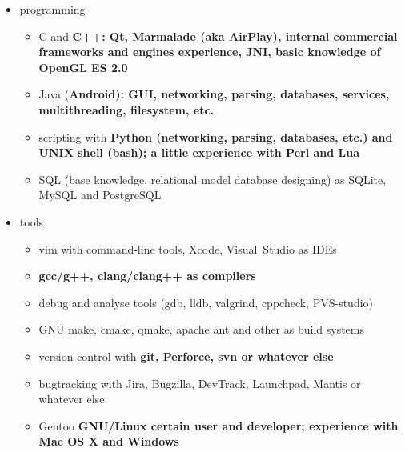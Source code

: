 \begin{itemize}

\item programming

    \begin{itemize}
    \item C and \bfseries C++\mdseries:
    Qt, Marmalade (aka AirPlay), internal commercial frameworks and engines experience,
    \bfseries JNI\mdseries, basic knowledge of OpenGL ES 2.0


    \item Java (\bfseries Android\mdseries):
    GUI, networking, parsing, databases, services, multithreading, filesystem, etc.


    \item scripting with
    \bfseries Python \mdseries (networking, parsing, databases, etc.)
    and
    \bfseries UNIX shell (bash)\mdseries;
    a little experience with
    \bfseries Perl \mdseries and \bfseries Lua\mdseries

    \item SQL (base knowledge, relational model database designing)
as SQLite, MySQL and PostgreSQL
    \end{itemize}

\item tools

    \begin{itemize}
    \item vim with command-line tools, Xcode, Visual~Studio as IDEs
    \item \bfseries gcc/g++\mdseries, clang/clang++ as compilers
    \item debug and analyse tools (gdb, lldb, valgrind, cppcheck, PVS-studio)
    \item GNU make, cmake, qmake, apache ant and other as build systems
    \item version control with \bfseries git\mdseries, Perforce, svn or whatever else
    \item bugtracking with Jira, Bugzilla, DevTrack, Launchpad, Mantis or whatever else
    \item Gentoo \bfseries GNU/Linux \mdseries certain user and developer;
    experience with \bfseries Mac OS X \mdseries and Windows
    \end{itemize}

\end{itemize}

